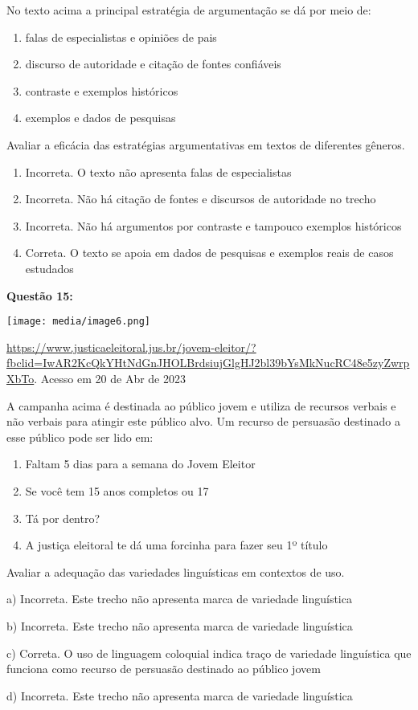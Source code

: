 No texto acima a principal estratégia de argumentação se dá por meio de:

\begin{enumerate}
\def\labelenumi{\alph{enumi})}
\item
  falas de especialistas e opiniões de pais
\item
  discurso de autoridade e citação de fontes confiáveis
\item
  contraste e exemplos históricos
\item
  exemplos e dados de pesquisas
\end{enumerate}

Avaliar a eficácia das estratégias argumentativas em textos de
diferentes gêneros.

\begin{enumerate}
\def\labelenumi{\alph{enumi})}
\item
  Incorreta. O texto não apresenta falas de especialistas
\item
  Incorreta. Não há citação de fontes e discursos de autoridade no
  trecho
\item
  Incorreta. Não há argumentos por contraste e tampouco exemplos
  históricos
\item
  Correta. O texto se apoia em dados de pesquisas e exemplos reais de
  casos estudados
\end{enumerate}

\textbf{Questão 15:}

\texttt{[image: media/image6.png]}

\href{https://www.justicaeleitoral.jus.br/jovem-eleitor/?fbclid=IwAR2KcQkYHtNdGnJHOLBrdsiujGlgHJ2bl39bYsMkNucRC48e5zyZwrpXbTo}{{https://www.justicaeleitoral.jus.br/jovem-eleitor/?fbclid=IwAR2KcQkYHtNdGnJHOLBrdsiujGlgHJ2bl39bYsMkNucRC48e5zyZwrpXbTo}}.
Acesso em 20 de Abr de 2023

A campanha acima é destinada ao público jovem e utiliza de recursos
verbais e não verbais para atingir este público alvo. Um recurso de
persuasão destinado a esse público pode ser lido em:

\begin{enumerate}
\def\labelenumi{\alph{enumi})}
\item
  Faltam 5 dias para a semana do Jovem Eleitor
\item
  Se você tem 15 anos completos ou 17
\item
  Tá por dentro?
\item
  A justiça eleitoral te dá uma forcinha para fazer seu 1º título
\end{enumerate}

Avaliar a adequação das variedades linguísticas em contextos de uso.

a) Incorreta. Este trecho não apresenta marca de variedade linguística

b) Incorreta. Este trecho não apresenta marca de variedade linguística

c) Correta. O uso de linguagem coloquial indica traço de variedade
linguística que funciona como recurso de persuasão destinado ao público
jovem

d) Incorreta. Este trecho não apresenta marca de variedade linguística
